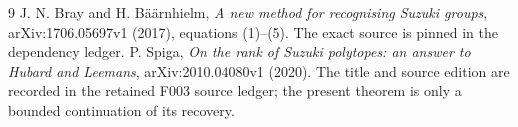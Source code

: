 \documentclass[11pt,a4paper]{article}
\begin{document}
\begin{thebibliography}{9}
J. N. Bray and H. B\"a\"arnhielm,
\emph{A new method for recognising Suzuki groups}, arXiv:1706.05697v1
(2017), equations (1)--(5). The exact source is pinned in the dependency
ledger.
P. Spiga, \emph{On the rank of Suzuki polytopes: an answer to Hubard and Leemans},
arXiv:2010.04080v1 (2020). The title and source edition are recorded
in the retained F003 source ledger; the present theorem is only a
bounded continuation of its recovery.
\end{thebibliography}
\end{document}

